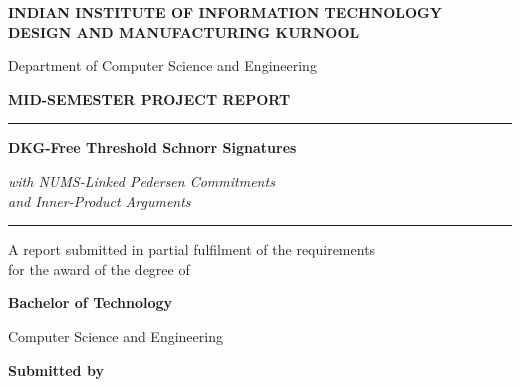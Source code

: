 \documentclass[10pt,a4paper]{article}
\begin{document}
\thispagestyle{empty}

\begin{center}

\vspace*{0.45cm}

{\Large\bfseries
INDIAN INSTITUTE OF INFORMATION TECHNOLOGY\\
DESIGN AND MANUFACTURING KURNOOL
}

\vspace{0.25cm}

{\normalsize
Department of Computer Science and Engineering
}

\vspace{1.25cm}

{\Large\bfseries MID-SEMESTER PROJECT REPORT}

\vspace{0.6cm}

\rule{0.78\textwidth}{0.6pt}

\vspace{0.65cm}

{\LARGE\bfseries
DKG-Free Threshold Schnorr Signatures
}

\vspace{0.35cm}

{\large
\textit{with NUMS-Linked Pedersen Commitments\\
and Inner-Product Arguments}
}

\vspace{0.65cm}

\rule{0.78\textwidth}{0.6pt}

\vspace{0.8cm}

{\normalsize
A report submitted in partial fulfilment of the requirements\\
for the award of the degree of
}

\vspace{0.35cm}

{\Large\bfseries
Bachelor of Technology
}

\vspace{0.15cm}

{\large
Computer Science and Engineering
}

\vfill

{\large\bfseries
Submitted by
}

\vspace{0.35cm}


\end{center}
\end{document}
